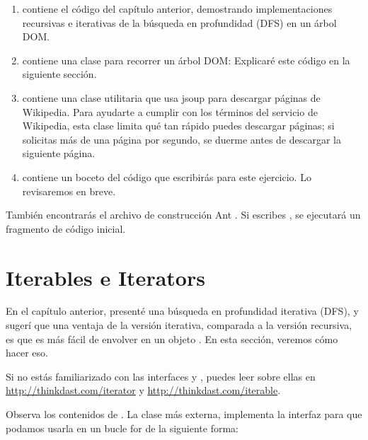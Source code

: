 \documentclass[12pt]{book}
\theoremstyle{exercise}
\begin{document}
\begin{enumerate}

\item
   contiene el código del capítulo
  anterior, demostrando implementaciones recursivas e iterativas de
  la búsqueda en profundidad (DFS) en un árbol DOM.

\item
   contiene una clase  para
  recorrer un árbol DOM: Explicaré este código en la siguiente sección.

\item
   contiene una clase utilitaria que usa jsoup para
  descargar páginas de Wikipedia. Para ayudarte a cumplir con los términos del
  servicio de Wikipedia, esta clase limita qué tan rápido puedes descargar páginas;
  si solicitas más de una página por segundo, se duerme antes de
  descargar la siguiente página.

\item
   contiene un boceto del código que escribirás
  para este ejercicio. Lo revisaremos en breve.

\end{enumerate}

También encontrarás el archivo de construcción Ant
.  Si escribes , se ejecutará
un fragmento de código inicial.



\section{Iterables e Iterators}
\label{iterables-and-iterators}

En el capítulo anterior, presenté una búsqueda en profundidad
iterativa (DFS), y sugerí que una ventaja de la versión iterativa,
comparada a la versión recursiva, es que es más fácil de envolver en
un objeto . En esta sección, veremos cómo hacer eso.


Si no estás familiarizado con las interfaces  y
, puedes leer sobre ellas en
\url{http://thinkdast.com/iterator}
y
\url{http://thinkdast.com/iterable}.

Observa los contenidos de . La clase más
externa,  implementa la
interfaz  para que podamos usarla en
un bucle for de la siguiente forma:
\end{document}
